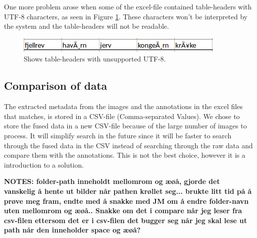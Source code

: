 \documentclass[USenglish]{uit-thesis}
\begin{document}

One more problem arose when some of the excel-file contained table-headers with UTF-8 characters, as seen in Figure \ref{fig:utf8}. These characters won't be interpreted by the system and the table-headers will not be readable.


\begin{figure}[b]
\centering
\includegraphics[width=\textwidth]{utf8.png}
\caption{Shows table-headers with unsupported UTF-8.}
\label{fig:utf8}
\end{figure}

\subsection{Comparison of data} \label{ssec:imp_compare}


The extracted metadata from the images and the annotations in the excel files that matches, is stored in a CSV-file (Comma-separated Values). We chose to store the fused data in a new CSV-file because of the large number of images to process. It will simplify search in the future since it will be faster to search through the fused data in the CSV instead of searching through the raw data and compare them with the annotations. This is not the best choice, however it is a introduction to a solution.



\textbf{NOTES: folder-path inneholdt mellomrom og æøå, gjorde det vanskelig å hente ut bilder når pathen krøllet seg... brukte litt tid på å prøve meg fram, endte med å snakke med JM om å endre folder-navn uten mellomrom og æøå.. Snakke om det i compare når jeg leser fra csv-filen ettersom det er i csv-filen det bugger seg når jeg skal lese ut path når den inneholder space og æøå?}
\end{document}
